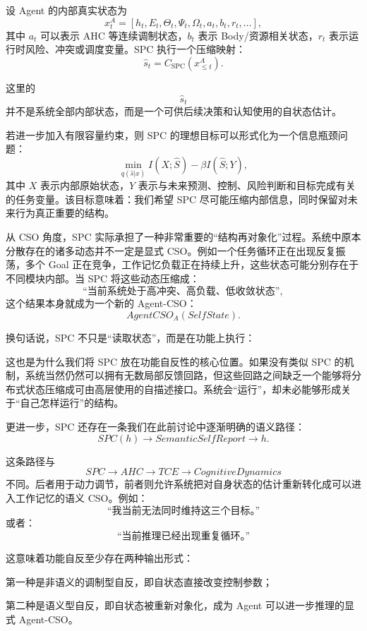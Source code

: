 设 Agent 的内部真实状态为
\[
x_t^A
=
\left[
h_t,E_t,\Theta_t,\Psi_t,\Omega_t,
a_t,b_t,r_t,\ldots
\right],
\]
其中 \(a_t\) 可以表示 AHC 等连续调制状态，\(b_t\) 表示 Body/资源相关状态，\(r_t\) 表示运行时风险、冲突或调度变量。SPC 执行一个压缩映射：
\[
\hat s_t
=
C_{\mathrm{SPC}}
\left(
x_{\leq t}^A
\right).
\]

这里的
\[
\hat s_t
\]
并不是系统全部内部状态，而是一个可供后续决策和认知使用的自状态估计。

若进一步加入有限容量约束，则 SPC 的理想目标可以形式化为一个信息瓶颈问题：
\[
\min_{q(\hat s|x)}
I(X;\hat S)
-
\beta I(\hat S;Y),
\]
其中 \(X\) 表示内部原始状态，\(Y\) 表示与未来预测、控制、风险判断和目标完成有关的任务变量。该目标意味着：我们希望 SPC 尽可能压缩内部信息，同时保留对未来行为真正重要的结构。

从 CSO 角度，SPC 实际承担了一种非常重要的“结构再对象化”过程。系统中原本分散存在的诸多动态并不一定是显式 CSO。例如一个任务循环正在出现反复振荡，多个 Goal 正在竞争，工作记忆负载正在持续上升，这些状态可能分别存在于不同模块内部。当 SPC 将这些动态压缩成：
\[
\text{“当前系统处于高冲突、高负载、低收敛状态”},
\]
这个结果本身就成为一个新的 Agent-CSO：
\[
AgentCSO_A(SelfState).
\]

换句话说，SPC 不只是“读取状态”，而是在功能上执行：
\begin{statementbox}
\centering
{}
\end{statementbox}

这也是为什么我们将 SPC 放在功能自反性的核心位置。如果没有类似 SPC 的机制，系统当然仍然可以拥有无数局部反馈回路，但这些回路之间缺乏一个能够将分布式状态压缩成可由高层使用的自描述接口。系统会“运行”，却未必能够形成关于“自己怎样运行”的结构。

更进一步，SPC 还存在一条我们在此前讨论中逐渐明确的语义路径：
\[
SPC(h)
\rightarrow
SemanticSelfReport
\rightarrow
h.
\]

这条路径与
\[
SPC
\rightarrow
AHC
\rightarrow
TCE
\rightarrow
CognitiveDynamics
\]
不同。后者用于动力调节，前者则允许系统把对自身状态的估计重新转化成可以进入工作记忆的语义 CSO。例如：
\[
\text{“我当前无法同时维持这三个目标。”}
\]
或者：
\[
\text{“当前推理已经出现重复循环。”}
\]

这意味着功能自反至少存在两种输出形式：

第一种是非语义的调制型自反，即自状态直接改变控制参数；

第二种是语义型自反，即自状态被重新对象化，成为 Agent 可以进一步推理的显式 Agent-CSO。


